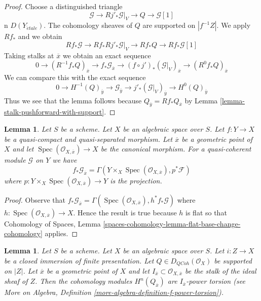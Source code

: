 \documentclass{stacks-project}
\theoremstyle{plain}
\newtheorem{lemma}[subsection]{Lemma}
\theoremstyle{definition}
\theoremstyle{remark}
\numberwithin{equation}{subsection}
\def\Spec{\mathop{\mathrm{Spec}}}
\def\etale{{\acute{e}tale}}
\def\QCoh{\mathit{QCoh}}
\begin{document}
\begin{proof}
Choose a distinguished triangle
$$
\mathcal{G} \to Rj'_*\mathcal{G}|_V \to Q \to \mathcal{G}[1]
$$
n $D(Y_\etale)$. The cohomology sheaves of $Q$
are supported on $|f^{-1}Z|$. We apply $Rf_*$ and we obtain
$$
Rf_*\mathcal{G} \to Rf_*Rj'_*\mathcal{G}|_V \to Rf_*Q
\to Rf_*\mathcal{G}[1]
$$
Taking stalks at $\overline{x}$ we obtain an exact sequence
$$
0 \to
(R^{-1}f_*Q)_{\overline{x}} \to
f_*\mathcal{G}_{\overline{x}} \to
(f \circ j')_*(\mathcal{G}|_V)_{\overline{x}} \to
(R^0f_*Q)_{\overline{x}}
$$
We can compare this with the exact sequence
$$
0 \to
H^{-1}(Q)_{\overline{y}} \to
\mathcal{G}_{\overline{y}} \to
j'_*(\mathcal{G}|_V)_{\overline{y}} \to
H^0(Q)_{\overline{y}}
$$
Thus we see that the lemma follows because
$Q_{\overline{y}} = Rf_*Q_{\overline{x}}$ by
Lemma \ref{lemma-stalk-pushforward-with-support}.
\end{proof}

\begin{lemma}
\label{lemma-stalk-of-pushforward}
Let $S$ be a scheme. Let $X$ be an algebraic space over $S$.
Let $f : Y \to X$ be a quasi-compact and quasi-separated morphism.
Let $\overline{x}$ be a geometric point of $X$ and let
$\Spec(\mathcal{O}_{X, \overline{x}}) \to X$
be the canonical morphism. For a quasi-coherent module
$\mathcal{G}$ on $Y$ we have
$$
f_*\mathcal{G}_{\overline{x}} =
\Gamma(Y \times_X \Spec(\mathcal{O}_{X, \overline{x}}), p^*\mathcal{F})
$$
where $p : Y \times_X \Spec(\mathcal{O}_{X, \overline{x}}) \to Y$
is the projection.
\end{lemma}

\begin{proof}
Observe that $f_*\mathcal{G}_{\overline{x}} =
\Gamma(\Spec(\mathcal{O}_{X, \overline{x}}), h^*f_*\mathcal{G})$
where $h : \Spec(\mathcal{O}_{X, \overline{x}}) \to X$.
Hence the result is true because $h$ is flat so that
Cohomology of Spaces, Lemma
\ref{spaces-cohomology-lemma-flat-base-change-cohomology}
applies.
\end{proof}

\begin{lemma}
\label{lemma-stalk-of-module-with-support}
Let $S$ be a scheme. Let $X$ be an algebraic space over $S$.
Let $i : Z \to X$ be a closed immersion of finite presentation.
Let $Q \in D_\QCoh(\mathcal{O}_X)$ be supported on $|Z|$.
Let $\overline{x}$ be a geometric point of $X$ and let
$I_{\overline{x}} \subset \mathcal{O}_{X, \overline{x}}$ be the stalk of
the ideal sheaf of $Z$. Then the cohomology modules
$H^n(Q_{\overline{x}})$ are $I_{\overline{x}}$-power torsion
(see More on Algebra, Definition
\ref{more-algebra-definition-f-power-torsion}).
\end{lemma}
\end{document}
